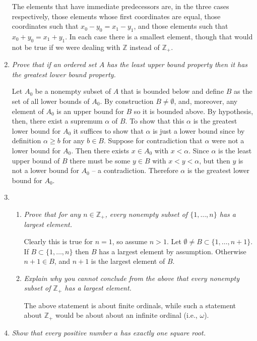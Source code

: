 \documentclass[letterpaper, 11pt]{article}
\newcommand{\Z}{\mathbb{Z}}
\begin{document}
\begin{enumerate}
The elements that have immediate predecessors are, in the three cases respectively, those elements whose first coordinates are equal, those coordinates such that $x_0 - y_0 = x_1 - y_1$, and those elements such that $x_0 + y_0 = x_1 + y_1$.  In each case there is a smallest element, though that would not be true if we were dealing with $\Z$ instead of $\Z_+$.

\item \emph{Prove that if an ordered set $A$ has the least upper bound property then it has the greatest lower bound property.}

Let $A_0$ be a nonempty subset of $A$ that is bounded below and define $B$ as the set of all lower bounds of $A_0$.  By construction $B \neq \emptyset$, and, moreover, any element of $A_0$ is an upper bound for $B$ so it is bounded above.  By hypothesis, then, there exist a supremum $\alpha$ of $B$.  To show that this $\alpha$ is the greatest lower bound for $A_0$ it suffices to show that $\alpha$ is just a lower bound since by definition $\alpha \geq b$ for any $b \in B$.  Suppose for contradiction that $\alpha$ were not a lower bound for $A_0$.  Then there exists $x \in A_0$ with $x < \alpha$.  Since $\alpha$ is the least upper bound of $B$ there must be some $y \in B$ with $x < y < \alpha$, but then $y$ is not a lower bound for $A_0$ -- a contradiction.  Therefore $\alpha$ is the greatest lower bound for $A_0$.

\item
\begin{enumerate}
\item \emph{Prove that for any $n \in \Z_+$, every nonempty subset of $\{1,\ldots,n\}$ has a largest element.}

Clearly this is true for $n=1$, so assume $n > 1$.  Let $\emptyset \neq B \subset \{1,\ldots,n+1\}$.  If $B \subset \{1,\ldots,n\}$ then $B$ has a largest element by assumption.  Otherwise $n+1 \in B$, and $n+1$ is the largest element of $B$.

\item \emph{Explain why you cannot conclude from the above that every nonempty subset of $\Z_+$ has a largest element.}

The above statement is about finite ordinals, while such a statement about $\Z_+$ would be about about an infinite ordinal (i.e., $\omega$).

\end{enumerate}

\item \emph{Show that every positive number $a$ has exactly one square root.}


\end{enumerate}
\end{document}
